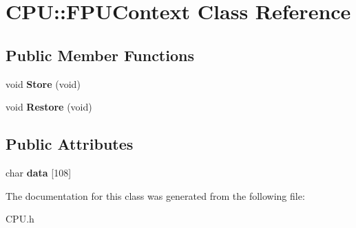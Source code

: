 \hypertarget{class_c_p_u_1_1_f_p_u_context}{}\section{C\+PU\+:\+:F\+P\+U\+Context Class Reference}
\label{class_c_p_u_1_1_f_p_u_context}
\subsection*{Public Member Functions}
\begin{DoxyCompactItemize}
\item 
\mbox{\label{class_c_p_u_1_1_f_p_u_context_a2049972f314c95d4b2b6eaeb8bec01cd}} 
void {\bfseries Store} (void)
\item 
\mbox{\label{class_c_p_u_1_1_f_p_u_context_ac3585931eb5408f7ed40966f582fc85e}} 
void {\bfseries Restore} (void)
\end{DoxyCompactItemize}
\subsection*{Public Attributes}
\begin{DoxyCompactItemize}
\item 
\mbox{\label{class_c_p_u_1_1_f_p_u_context_acf8229836e3e097a0b9cb27931492424}} 
char {\bfseries data} \mbox{[}108\mbox{]}
\end{DoxyCompactItemize}


The documentation for this class was generated from the following file\+:\begin{DoxyCompactItemize}
\item 
C\+P\+U.\+h\end{DoxyCompactItemize}
